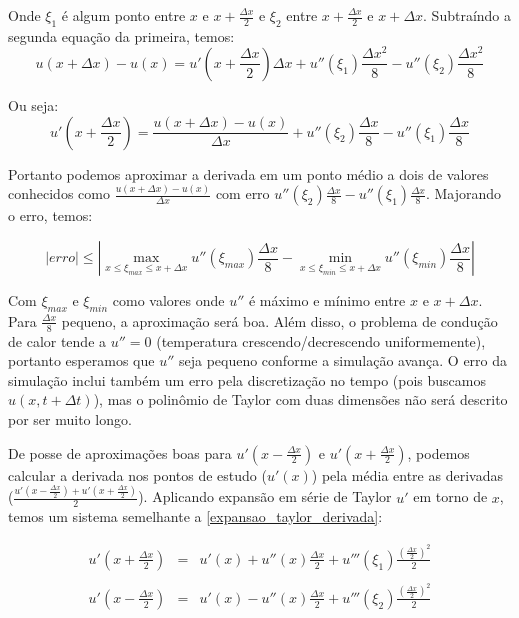 \documentclass[12pt,fleqn]{article}
\begin{document}
Onde $\xi_1$ é algum ponto entre $x$ e $x + \frac{\Delta x}{2}$ e $\xi_2$ entre $x + \frac{\Delta x}{2}$ e $x + \Delta x$. Subtraíndo a segunda equação da primeira, temos:
\[u(x + \Delta x) - u(x) = u'(x + \frac{\Delta x}{2}) \Delta x + u''(\xi_1) \frac{\Delta x ^ 2}{8} - u''(\xi_2) \frac{\Delta x ^ 2}{8}\]

Ou seja:
\[u'(x + \frac{\Delta x}{2}) = \frac{u(x + \Delta x) - u(x)}{\Delta x} + u''(\xi_2) \frac{\Delta x}{8} - u''(\xi_1) \frac{\Delta x}{8}\]

Portanto podemos aproximar a derivada em um ponto médio a dois de valores conhecidos como $\frac{u(x + \Delta x) - u(x)}{\Delta x}$ com erro $u''(\xi_2) \frac{\Delta x}{8} - u''(\xi_1) \frac{\Delta x}{8}$. Majorando o erro, temos:

\[|erro| \leq |\max_{x \leq \xi_{max} \leq x + \Delta x} u''(\xi_{max}) \frac{\Delta x}{8} - \min_{x \leq \xi_{min} \leq x + \Delta x} u''(\xi_{min}) \frac{\Delta x}{8}|\]

Com $\xi_{max}$ e $\xi_{min}$ como valores onde $u''$ é máximo e mínimo entre $x$ e $x + \Delta x$. Para $\frac{\Delta x}{8}$ pequeno, a aproximação será boa. Além disso, o problema de condução de calor tende a $u'' = 0$ (temperatura crescendo/decrescendo uniformemente), portanto esperamos que $u''$ seja pequeno conforme a simulação avança. O erro da simulação inclui também um erro pela discretização no tempo (pois buscamos $u(x, t + \Delta t)$), mas o polinômio de Taylor com duas dimensões não será descrito por ser muito longo.

De posse de aproximações boas para $u'(x - \frac{\Delta x}{2})$ e $u'(x + \frac{\Delta x}{2})$, podemos calcular a derivada nos pontos de estudo ($u'(x)$) pela média entre as derivadas ($\frac{u'(x - \frac{\Delta x}{2}) + u'(x + \frac{\Delta x}{2})}{2}$). Aplicando expansão em série de Taylor $u'$ em torno de $x$, temos um sistema semelhante a \ref{expansao_taylor_derivada}:

\begin{equation}
\label{expansao_taylor_derivada_central}
\begin{array}{rcl}
	u'(x + \frac{\Delta x}{2}) & = & u'(x) + u''(x) \frac{\Delta x}{2} + u'''(\xi_1) \frac{(\frac{\Delta x}{2}) ^ 2}{2} \\ \\
	u'(x - \frac{\Delta x}{2}) & = & u'(x) - u''(x) \frac{\Delta x}{2} + u'''(\xi_2) \frac{(\frac{\Delta x}{2}) ^ 2}{2}
\end{array}
\end{equation}
\end{document}
